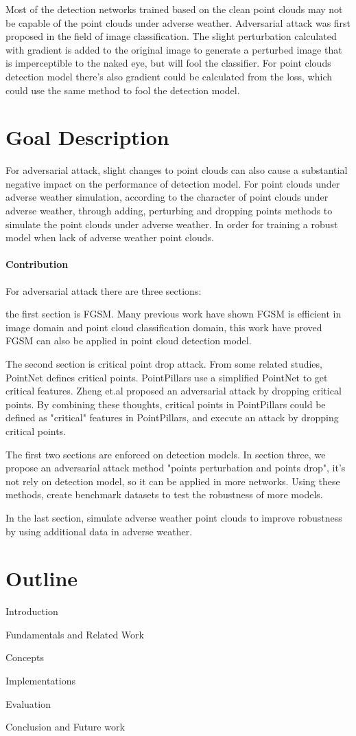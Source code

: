 Most of the detection networks trained based on the clean point clouds may not be capable of the point clouds under adverse weather. Adversarial attack was first proposed in the field of image classification. The slight perturbation calculated with gradient is added to the original image to generate a perturbed image that is imperceptible to the naked eye, but will fool the classifier.
For point clouds detection model there's also gradient could be calculated from the loss, which could use the same method to fool the detection model.

\section{Goal Description}
For adversarial attack, slight changes to point clouds can also cause a substantial negative impact on 
the performance of detection model. For point clouds under adverse weather simulation, according to the character of point clouds under adverse weather, through adding, perturbing and dropping points methods to simulate the point clouds under adverse weather. In order for training a robust model when lack of adverse weather point clouds.
\paragraph{Contribution}
For adversarial attack there are three sections: 

the first section is FGSM. Many previous work have shown FGSM is efficient in image domain and point cloud classification domain\cite{liu_extending_2019}, this work have proved FGSM can also be applied in point cloud detection model. 

The second section is critical point drop attack. From some related studies, PointNet\cite{qi_pointnet_2017-1} defines critical points. PointPillars use a simplified PointNet to get critical features. Zheng et.al \cite{zheng_pointcloud_2019} proposed an adversarial attack by dropping critical points. By combining these thoughts, critical points in PointPillars could be defined as "critical" features in PointPillars, and execute an attack by dropping critical points. 

The first two sections are enforced on detection models.
In section three, we propose an adversarial attack method "points perturbation and points drop", it's not rely on detection model, so it can be applied in more networks. Using these methods, create benchmark datasets to test the robustness of more models. 

In the last section, simulate adverse weather point clouds to improve robustness by using additional data in adverse weather.


\section{Outline}
Introduction

Fundamentals and Related Work

Concepts

Implementations

Evaluation

Conclusion and Future work


